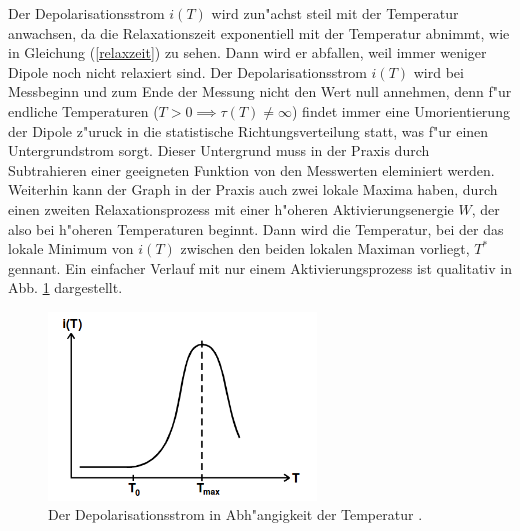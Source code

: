     Der Depolarisationsstrom $i(T)$ wird zun"achst steil mit der Temperatur anwachsen, da die Relaxationszeit exponentiell mit der Temperatur abnimmt, wie in Gleichung (\ref{relaxzeit}) zu sehen.
    Dann wird er abfallen, weil immer weniger Dipole noch nicht relaxiert sind.
    Der Depolarisationsstrom $i(T)$ wird bei Messbeginn und zum Ende der Messung nicht den Wert null annehmen, denn f"ur endliche Temperaturen ($T>0 \implies \tau(T) \neq \infty$) findet immer eine Umorientierung der Dipole z"uruck in die statistische Richtungsverteilung statt, was f"ur einen Untergrundstrom sorgt.
    Dieser Untergrund muss in der Praxis durch Subtrahieren einer geeigneten Funktion von den Messwerten eleminiert werden.
    Weiterhin kann der Graph in der Praxis auch zwei lokale Maxima haben, durch einen zweiten Relaxationsprozess mit einer h"oheren Aktivierungsenergie $W$, der also bei h"oheren Temperaturen beginnt.
    Dann wird die Temperatur, bei der das lokale Minimum von $i(T)$ zwischen den beiden lokalen Maximan vorliegt, $T^*$ gennant.
    Ein einfacher Verlauf mit nur einem Aktivierungsprozess ist qualitativ in Abb. \ref{fig:depolstrom} dargestellt.
    \begin{figure}[H]
      \centering
      \includegraphics[height=5cm]{bilder/Depolarisationsstrom.png}
      \caption{Der Depolarisationsstrom in Abh"angigkeit der Temperatur \cite{Anleitung}.}
      \label{fig:depolstrom}
    \end{figure}



